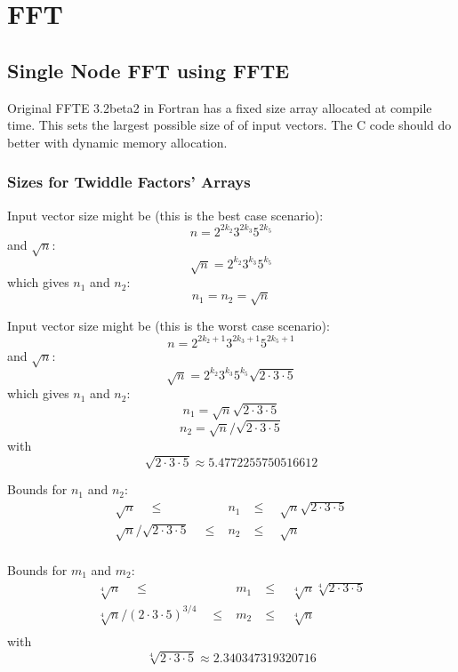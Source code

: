 \documentclass[twocolumn]{article}
\begin{document}
\section{FFT}

\subsection{Single Node FFT using FFTE}
Original FFTE 3.2beta2 in Fortran has a fixed size array allocated at compile
time. This sets the largest possible size of of input vectors. The C code
should do better with dynamic memory allocation.

\subsubsection{Sizes for Twiddle Factors' Arrays}

Input vector size might be (this is the best case scenario):
\[ n=2^{2k_2}3^{2k_3}5^{2k_5} \]
and $\sqrt{n}$:
\[ \sqrt{n}=2^{k_2}3^{k_3}5^{k_5} \]
which gives $n_1$ and $n_2$:
\[ n_1=n_2=\sqrt{n} \]

Input vector size might be (this is the worst case scenario):
\[ n=2^{2k_2+1}3^{2k_3+1}5^{2k_5+1} \]
and $\sqrt{n}$:
\[ \sqrt{n}=2^{k_2}3^{k_3}5^{k_5}\sqrt{2\cdot 3\cdot 5} \]
which gives $n_1$ and $n_2$:
\[ n_1=\sqrt{n}\sqrt{2\cdot 3\cdot 5} \]
\[ n_2=\sqrt{n}/\sqrt{2\cdot 3\cdot 5} \]
with
\[ \sqrt{2\cdot 3\cdot 5}\approx 5.4772255750516612 \]

Bounds for $n_1$ and $n_2$:
\begin{eqnarray*}
\sqrt{n} \quad \le & n_1 & \le \quad \sqrt{n} \sqrt{2\cdot3\cdot5} \\
\sqrt{n}/\sqrt{2\cdot3\cdot5} \quad \le & n_2 & \le \quad \sqrt{n} \\
\end{eqnarray*}

Bounds for $m_1$ and $m_2$:
\begin{eqnarray*}
\sqrt[4]{n} \quad \le & m_1 & \le \quad \sqrt[4]{n} \sqrt[4]{2\cdot 3\cdot 5} \\
\sqrt[4]{n}/(2\cdot 3\cdot 5)^{3/4} \quad \le & m_2 & \le \quad \sqrt[4]{n} \\
\end{eqnarray*}
with
\[ \sqrt[4]{2\cdot 3\cdot 5}\approx 2.340347319320716 \]
\end{document}
